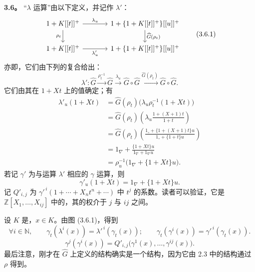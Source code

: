 \textbf{3.6。} “$\lambda$ 运算”由以下定义，并记作 $\lambda'$：
\[
\begin{tikzcd}[column sep=large]
1+K[[t]]^+ \arrow[r,"\lambda_u"] \arrow[d,"\rho_t"'] &
1+\{1+K[[t]]^+\}[[u]]^+ \arrow[d,"\widehat G(\rho_t)"]\\
1+K[[t]]^+ \arrow[r,"\lambda'_u"'] &
1+\{1+K[[t]]^+\}[[u]]^+
\end{tikzcd}
\tag{3.6.1}
\]
亦即，它们由下列的复合给出：
\[
\lambda':\widehat G\xrightarrow{\rho_t^{-1}}\widehat G
\xrightarrow{\lambda_u}\widehat G\circ\widehat G
\xrightarrow{\widehat G(\rho_t)}\widehat G\circ\widehat G.
\]
它们由其在 $1+Xt$ 上的值确定；有
\[
\begin{aligned}
\lambda'_u(1+Xt)
&=\widehat G(\rho_t)\bigl(\lambda_u\rho_t^{-1}(1+Xt)\bigr)\\
&=\widehat G(\rho_t)\left(\lambda_u\frac{1+(X+1)t}{1+t}\right)\\
&=\widehat G(\rho_t)\left(\frac{1_\circ+\{1+(X+1)t\}u}{1_\circ+\{1+t\}u}\right)\\
&=1_\nabla+\frac{\{1+Xt\}u}{1_\nabla+1_\nabla u}\\
&=\rho_u^{-1}\bigl(1_\nabla+\{1+Xt\}u\bigr).
\end{aligned}
\]
若记 $\gamma'$ 为与运算 $\lambda'$ 相应的 $\gamma$ 运算，则
\[
\gamma'_u(1+Xt)=1_\nabla+\{1+Xt\}u.
\tag{3.6.2}
\]
记 $Q'_{i,j}$ 为 $\gamma'^{\,i}(1+\cdots+X_nt^n+\cdots)$ 中 $t^j$ 的系数。读者可以验证，它是 $\mathbb Z[X_1,\ldots,X_{ij}]$ 中的，其的权介于 $j$ 与 $ij$ 之间。

设 $K$ 是，$x\in K$。由图 (3.6.1)，得到
\[
\forall i\in\mathbb N,\qquad
\gamma_t(\lambda^i(x))=\lambda'^{\,i}(\gamma_t(x));\qquad
\gamma_t(\gamma^i(x))=\gamma'^{\,i}(\gamma_t(x)).
\tag{3.6.3}
\]
\[
\gamma^j(\gamma^i(x))=Q'_{i,j}\bigl(\gamma^1(x),\ldots,\gamma^{ij}(x)\bigr).
\tag{3.6.4}
\]
最后注意，刚才在 $\widehat G$ 上定义的结构确实是一个结构，因为它由 2.3 中的结构通过 $\rho$ 得到。

